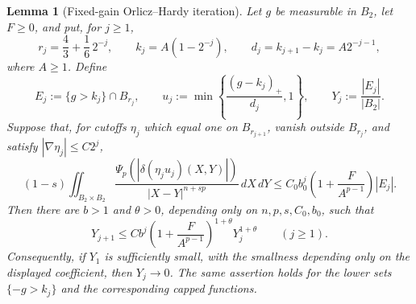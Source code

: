 \documentclass[11pt,reqno]{amsart}
\numberwithin{equation}{section}
\newcommand{\dd}{\,d}
\newtheorem{lemma}[theorem]{Lemma}
\theoremstyle{remark}
\begin{document}
\begin{lemma}[Fixed-gain Orlicz--Hardy iteration]
\label{lem:fixed-gain-orlicz-hardy}
Let \(g\) be measurable in \(B_2\), let \(F\ge0\), and put, for
\(j\ge1\),
\[
 r_j=\frac43+\frac16\,2^{-j},\qquad
 k_j=A(1-2^{-j}),\qquad d_j=k_{j+1}-k_j=A2^{-j-1},
\]
where \(A\ge1\).  Define
\[
 E_j:=\{g>k_j\}\cap B_{r_j},\qquad
 u_j:=\min\left\{\frac{(g-k_j)_+}{d_j},1\right\},
 \qquad Y_j:=\frac{|E_j|}{|B_2|}.
\]
Suppose that, for cutoffs \(\eta_j\) which equal one
on \(B_{r_{j+1}}\), vanish outside \(B_{r_j}\), and satisfy
\(|\nabla\eta_j|\le C2^j\),
\begin{equation}
 (1-s)\iint_{B_2\times B_2}
 \frac{\Psi_p(|\delta(\eta_ju_j)(X,Y)|)}
 {|X-Y|^{n+sp}}\dd X\!\dd Y
 \le C_0b_0^j\left(1+\frac{F}{A^{p-1}}\right)|E_j|.
 \label{eq:orlicz-hardy-caccioppoli-estimate}
\end{equation}
Then there are \(b>1\) and \(\theta>0\), depending only on
\(n,p,s,C_0,b_0\), such that
\begin{equation}
 Y_{j+1}\le Cb^j
 \left(1+\frac{F}{A^{p-1}}\right)^{1+\theta}
 Y_j^{1+\theta}\qquad(j\ge1).
 \label{eq:orlicz-hardy-fixed-gain}
\end{equation}
Consequently, if \(Y_1\) is sufficiently small, with the smallness
depending only on the displayed coefficient, then \(Y_j\to0\).
The same assertion holds for the lower sets
\(\{-g>k_j\}\) and the corresponding capped functions.
\end{lemma}
\end{document}
